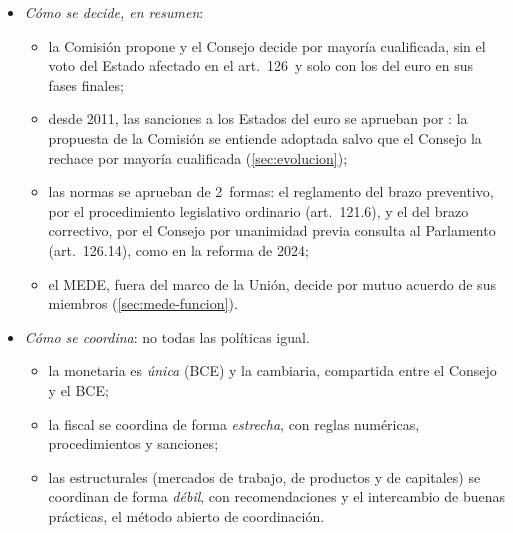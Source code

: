 \documentclass[11pt]{article}
\begin{document}
\begin{itemize}
\begin{itemize}
  \item la  reúne a los jefes de Estado o de Gobierno de la zona del euro, con el presidente del Consejo Europeo, , y da las orientaciones;
  \item el  colegisla los reglamentos y celebra un \emph{diálogo económico} con la Comisión, el Consejo y los Estados, pero no decide en los procedimientos;
  \item las : el \emph{Consejo Fiscal Europeo} (2016), órgano asesor de la Comisión que preside , y las nacionales que exige la Directiva de marcos presupuestarios, en España la \emph{AIReF} (2013), que preside  desde marzo de 2026\nocite{DirUE2024Marcos,EFB2026Planes} .
  \end{itemize}
\item \emph{Cómo se decide, en resumen}:
  \begin{itemize}
  \item la Comisión propone y el Consejo decide por mayoría cualificada, sin el voto del Estado afectado en el art.~126~y solo con los del euro en sus fases finales;
  \item desde 2011, las sanciones a los Estados del euro se aprueban por : la propuesta de la Comisión se entiende adoptada salvo que el Consejo la rechace por mayoría cualificada\nocite{UE2011Reglamento1173} (\ref{sec:evolucion});
  \item las normas se aprueban de 2~formas: el reglamento del brazo preventivo, por el procedimiento legislativo ordinario (art.~121.6), y el del brazo correctivo, por el Consejo por unanimidad previa consulta al Parlamento (art.~126.14), como en la reforma de 2024\nocite{UE2016TFUE,UE2024Reglamento1263,UE2024Reglamento1264};
  \item el MEDE, fuera del marco de la Unión, decide por mutuo acuerdo de sus miembros (\ref{sec:mede-funcion}).
  \end{itemize}
\item \emph{Cómo se coordina}: no todas las políticas igual.
  \begin{itemize}
  \item la monetaria es \emph{única} (BCE) y la cambiaria, compartida entre el Consejo y el BCE;
  \item la fiscal se coordina de forma \emph{estrecha}, con reglas numéricas, procedimientos y sanciones;
  \item las estructurales (mercados de trabajo, de productos y de capitales) se coordinan de forma \emph{débil}, con recomendaciones y el intercambio de buenas prácticas, el método abierto de coordinación.
  \end{itemize}
\end{itemize}
\end{document}
